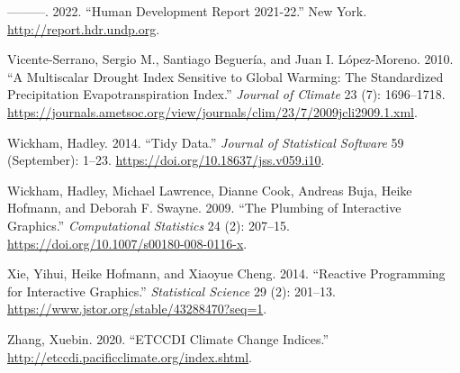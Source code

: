 \documentclass[
]{interact}
\newlength{\cslhangindent}
\newlength{\cslentryspacingunit} %
\newenvironment{CSLReferences}[2] %
 {%
  \setlength{\parindent}{0pt}
  \ifodd #1
  \let\oldpar\par
  \def\par{\hangindent=\cslhangindent\oldpar}
  \fi
  \setlength{\parskip}{#2\cslentryspacingunit}
 }%
 {}
\begin{document}
\begin{CSLReferences}{1}{0}
\leavevmode{}%
---------. 2022. {``Human Development Report 2021-22.''} New York.
\url{http://report.hdr.undp.org}.

\leavevmode{}%
Vicente-Serrano, Sergio M., Santiago Beguería, and Juan I. López-Moreno.
2010. {``A {Multiscalar} {Drought} {Index} {Sensitive} to {Global}
{Warming}: {The} {Standardized} {Precipitation} {Evapotranspiration}
{Index}.''} \emph{Journal of Climate} 23 (7): 1696--1718.
\url{https://journals.ametsoc.org/view/journals/clim/23/7/2009jcli2909.1.xml}.

\leavevmode{}%
Wickham, Hadley. 2014. {``Tidy {Data}.''} \emph{Journal of Statistical
Software} 59 (September): 1--23.
\url{https://doi.org/10.18637/jss.v059.i10}.

\leavevmode{}%
Wickham, Hadley, Michael Lawrence, Dianne Cook, Andreas Buja, Heike
Hofmann, and Deborah F. Swayne. 2009. {``The Plumbing of Interactive
Graphics.''} \emph{Computational Statistics} 24 (2): 207--15.
\url{https://doi.org/10.1007/s00180-008-0116-x}.

\leavevmode{}%
Xie, Yihui, Heike Hofmann, and Xiaoyue Cheng. 2014. {``Reactive
{Programming} for {Interactive} {Graphics}.''} \emph{Statistical
Science} 29 (2): 201--13.
\url{https://www.jstor.org/stable/43288470?seq=1}.

\leavevmode{}%
Zhang, Xuebin. 2020. {``ETCCDI Climate Change Indices.''}
\url{http://etccdi.pacificclimate.org/index.shtml}.

\end{CSLReferences}
\end{document}
